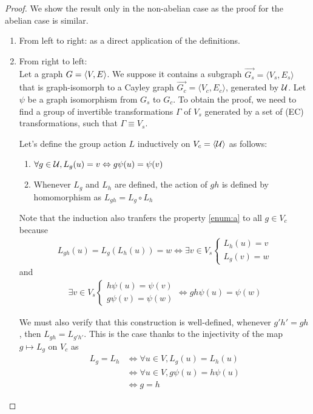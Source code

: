 \begin{proof}
We show the result only in the non-abelian case as the proof for the abelian case is similar.
\begin{enumerate}
	\item From left to right: as a direct application of the definitions.

	\item From right to left:\\
Let a graph $G = \langle V, E \rangle$. We suppose it contains a subgraph $\vec{G_s} = \langle V_s, E_s \rangle$ that is graph-isomorph to a Cayley graph $\vec{G_c} = \langle V_c, E_c \rangle$, generated by $\mathcal{U}$. Let $\psi$ be a graph isomorphism from $G_s$ to $G_c$. To obtain the proof, we need to find a group of invertible transformations $\Gamma$ of $V_s$ generated by a set of (EC) transformations, such that $\Gamma \equiv V_s$.

Let's define the group action $L$ inductively on $V_c = \langle \mathcal{U} \rangle$ as follows:
\begin{enumerate}[label=(\alph*)]
  \item $\forall g \in \mathcal{U}, L_g(u) = v \Leftrightarrow g\psi(u) = \psi(v)$ \label{enum:a}
  \item Whenever $L_g$ and $L_h$ are defined, the action of $gh$ is defined by homomorphism as $L_{gh}= L_g \circ L_h$
\end{enumerate}

Note that the induction also tranfers the property \ref{enum:a} to all $g \in V_c$ because
\begin{gather*}
L_{gh}(u) = L_g(L_h(u)) = w \Leftrightarrow \exists v \in V_s
\begin{cases}
L_h(u) = v\\
L_g(v) = w
\end{cases}
\end{gather*}
and
\begin{gather*}
\exists v \in V_s
\begin{cases}
h\psi(u) = \psi(v)\\
g\psi(v) = \psi(w)
\end{cases}
\Leftrightarrow gh\psi(u) = \psi(w)
\end{gather*}

We must also verify that this construction is well-defined, \ie whenever $g'h' = gh$, then $L_{gh} = L_{g'h'}$. This is the case thanks to the injectivity of the map $g \mapsto L_g$ on $V_c$ as
\begin{align*}
L_g = L_h & \Leftrightarrow \forall u \in V, L_g(u) = L_h(u)\\
 & \Leftrightarrow \forall u \in V, g\psi(u) = h\psi(u)\\
 & \Leftrightarrow g = h
\end{align*}


\end{enumerate}
\end{proof}

